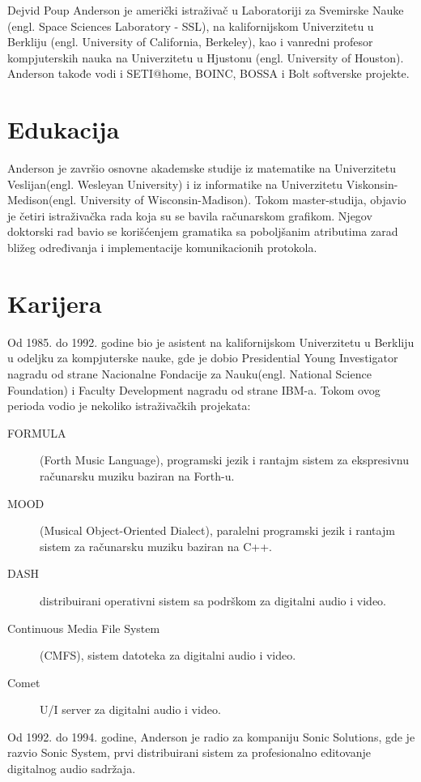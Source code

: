\documentclass[titlepage, 12pt]{article}
\begin{document}
Dejvid Poup Anderson je američki istraživač u Laboratoriji za Svemirske Nauke (engl. Space Sciences Laboratory - SSL), na kalifornijskom Univerzitetu u Berkliju (engl. University of California, Berkeley), kao i vanredni profesor kompjuterskih nauka na Univerzitetu u Hjustonu (engl. University of Houston). Anderson takođe vodi i SETI@home, BOINC, BOSSA i Bolt softverske projekte.
\section{Edukacija}
Anderson je završio osnovne akademske studije iz matematike na Univerzitetu Veslijan(engl. Wesleyan University) i iz informatike na Univerzitetu Viskonsin-Medison(engl. University of Wisconsin-Madison). Tokom master-studija, objavio je četiri istraživačka rada koja su se bavila računarskom grafikom. Njegov doktorski rad bavio se korišćenjem gramatika sa poboljšanim atributima zarad bližeg određivanja i implementacije komunikacionih protokola.

\section{Karijera}
Od 1985. do 1992. godine bio je asistent na kalifornijskom Univerzitetu u Berkliju u odeljku za kompjuterske nauke, gde je dobio Presidential Young Investigator nagradu od strane Nacionalne Fondacije za Nauku(engl. National Science Foundation) i Faculty Development nagradu od strane IBM-a. Tokom ovog perioda vodio je nekoliko istraživačkih projekata:
\begin{description}
	\item[FORMULA] (Forth Music Language), programski jezik i rantajm sistem za ekspresivnu računarsku muziku baziran na Forth-u.
	\item[MOOD] (Musical Object-Oriented Dialect), paralelni programski jezik i rantajm sistem za računarsku muziku baziran na C++.
	
	\item[DASH] distribuirani operativni sistem sa podrškom za digitalni audio i video.
	
	\item[Continuous Media File System] (CMFS), sistem datoteka za digitalni audio i video.
	
	\item[Comet] U/I server za digitalni audio i video.
	
\end{description}
Od 1992. do 1994. godine, Anderson je radio za kompaniju Sonic Solutions, gde je razvio Sonic System, prvi distribuirani sistem za profesionalno editovanje digitalnog audio sadržaja.
\end{document}
